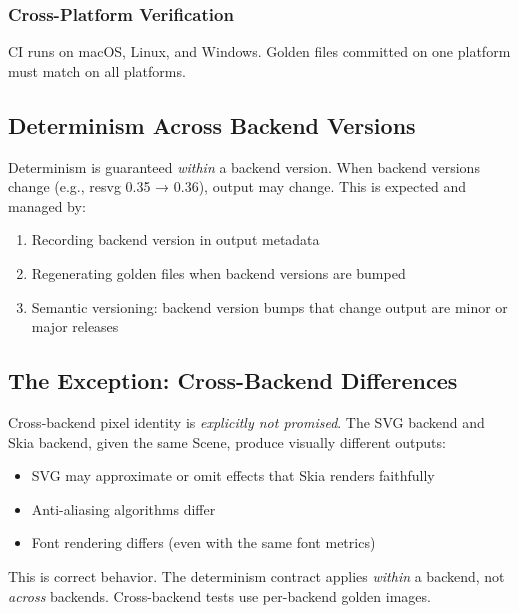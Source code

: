 \subsubsection{Cross-Platform Verification}

CI runs on macOS, Linux, and Windows. Golden files committed on one platform must match on all platforms.

\subsection{Determinism Across Backend Versions}

Determinism is guaranteed \emph{within} a backend version. When backend versions change (e.g., resvg 0.35 → 0.36), output may change. This is expected and managed by:

\begin{enumerate}
  \item Recording backend version in output metadata
  \item Regenerating golden files when backend versions are bumped
  \item Semantic versioning: backend version bumps that change output are minor or major releases
\end{enumerate}

\subsection{The Exception: Cross-Backend Differences}

Cross-backend pixel identity is \emph{explicitly not promised}. The SVG backend and Skia backend, given the same Scene, produce visually different outputs:

\begin{itemize}
  \item SVG may approximate or omit effects that Skia renders faithfully
  \item Anti-aliasing algorithms differ
  \item Font rendering differs (even with the same font metrics)
\end{itemize}

This is correct behavior. The determinism contract applies \emph{within} a backend, not \emph{across} backends. Cross-backend tests use per-backend golden images.
